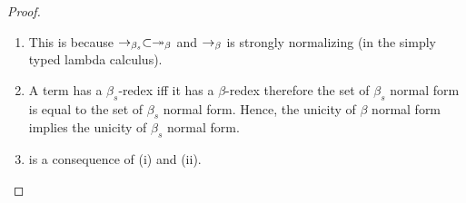 \begin{proof}
\begin{enumerate}


\item This is because $\rightarrow_{\beta_s} \subset \twoheadrightarrow_\beta$ and $\rightarrow_\beta$ is strongly normalizing (in the simply typed lambda calculus).

\item
A term has a $\beta_s$-redex iff it has a $\beta$-redex therefore
the set of $\beta_s$ normal form is equal to the set of $\beta_s$
normal form. Hence, the unicity of $\beta$ normal form implies the
unicity of $\beta_s$ normal form.

\item is a consequence of (i) and (ii).
\end{enumerate}
\end{proof}





